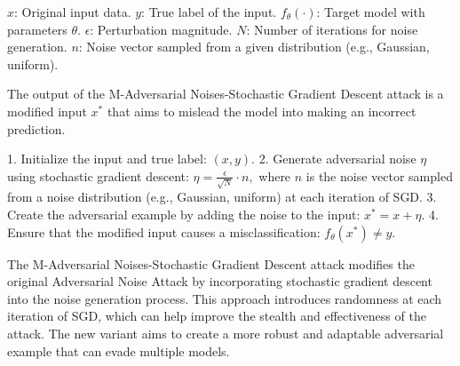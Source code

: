 $x$: Original input data.
$y$: True label of the input.
$f_{\theta}(\cdot)$: Target model with parameters $\theta$.
$\epsilon$: Perturbation magnitude.
$N$: Number of iterations for noise generation.
$n$: Noise vector sampled from a given distribution (e.g., Gaussian, uniform).

The output of the M-Adversarial Noises-Stochastic Gradient Descent attack is a modified input $x^*$ that aims to mislead the model into making an incorrect prediction.

1. Initialize the input and true label:
   $
   (x, y).
   $
2. Generate adversarial noise $\eta$ using stochastic gradient descent:
   $
   \eta = \frac{\epsilon}{\sqrt{N}} \cdot n,
   $
   where $n$ is the noise vector sampled from a noise distribution (e.g., Gaussian, uniform) at each iteration of SGD.
3. Create the adversarial example by adding the noise to the input:
   $
   x^* = x + \eta.
   $
4. Ensure that the modified input causes a misclassification:
   $
   f_{\theta}(x^*) \neq y.
   $

The M-Adversarial Noises-Stochastic Gradient Descent attack modifies the original Adversarial Noise Attack by incorporating stochastic gradient descent into the noise generation process. This approach introduces randomness at each iteration of SGD, which can help improve the stealth and effectiveness of the attack. The new variant aims to create a more robust and adaptable adversarial example that can evade multiple models.